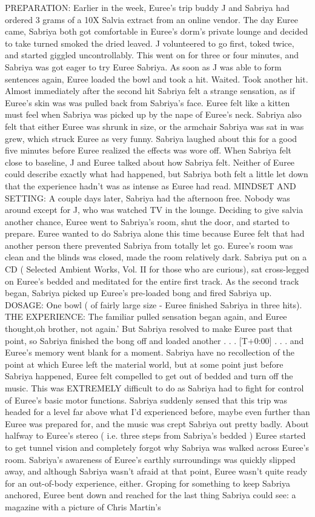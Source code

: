 \documentclass[12pt]{book}
\begin{document}
PREPARATION: Earlier in the week, Euree's trip buddy J and Sabriya had ordered 3 grams of a 10X Salvia extract from an online vendor. The day Euree came, Sabriya both got comfortable in Euree's dorm's private lounge and decided to take turned smoked the dried leaved. J volunteered to go first, toked twice, and started giggled uncontrollably. This went on for three or four minutes, and Sabriya was got eager to try Euree Sabriya. As soon as J was able to form sentences again, Euree loaded the bowl and took a hit. Waited. Took another hit. Almost immediately after the second hit Sabriya felt a strange sensation, as if Euree's skin was was pulled back from Sabriya's face. Euree felt like a kitten must feel when Sabriya was picked up by the nape of Euree's neck. Sabriya also felt that either Euree was shrunk in size, or the armchair Sabriya was sat in was grew, which struck Euree as very funny. Sabriya laughed about this for a good five minutes before Euree realized the effects was wore off. When Sabriya felt close to baseline, J and Euree talked about how Sabriya felt. Neither of Euree could describe exactly what had happened, but Sabriya both felt a little let down that the experience hadn't was as intense as Euree had read. MINDSET AND SETTING: A couple days later, Sabriya had the afternoon free. Nobody was around except for J, who was watched TV in the lounge. Deciding to give salvia another chance, Euree went to Sabriya's room, shut the door, and started to prepare. Euree wanted to do Sabriya alone this time because Euree felt that had another person there prevented Sabriya from totally let go. Euree's room was clean and the blinds was closed, made the room relatively dark. Sabriya put on a CD ( Selected Ambient Works, Vol. II for those who are curious), sat cross-legged on Euree's bedded and meditated for the entire first track. As the second track began, Sabriya picked up Euree's pre-loaded bong and fired Sabriya up. DOSAGE: One bowl ( of fairly large size - Euree finished Sabriya in three hits). THE EXPERIENCE: The familiar pulled sensation began again, and Euree thought,oh brother, not again.' But Sabriya resolved to make Euree past that point, so Sabriya finished the bong off and loaded another . . .  [T+0:00]  . . .  and Euree's memory went blank for a moment. Sabriya have no recollection of the point at which Euree left the material world, but at some point just before Sabriya happened, Euree felt compelled to get out of bedded and turn off the music. This was EXTREMELY difficult to do as Sabriya had to fight for control of Euree's basic motor functions. Sabriya suddenly sensed that this trip was headed for a level far above what I'd experienced before, maybe even further than Euree was prepared for, and the music was crept Sabriya out pretty badly. About halfway to Euree's stereo ( i.e. three steps from Sabriya's bedded ) Euree started to get tunnel vision and completely forgot why Sabriya was walked across Euree's room. Sabriya's awareness of Euree's earthly surroundings was quickly slipped away, and although Sabriya wasn't afraid at that point, Euree wasn't quite ready for an out-of-body experience, either. Groping for something to keep Sabriya anchored, Euree bent down and reached for the last thing Sabriya could see: a magazine with a picture of Chris Martin's 
\end{document}
